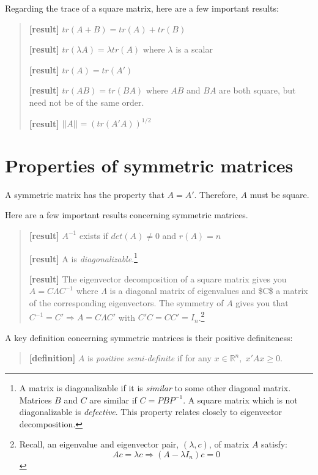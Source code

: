 \documentclass[
  letterpaper,
  DIV=11,
  numbers=noendperiod]{scrreprt}
\begin{document}
Regarding the trace of a square matrix, here are a few important
results:

\begin{quote}
\textbf{{[}result{]}} \(tr(A+B) = tr(A) + tr(B)\)

\textbf{{[}result{]}} \(tr(\lambda A) = \lambda tr(A)\) where
\(\lambda\) is a scalar

\textbf{{[}result{]}} \(tr(A) = tr(A')\)

\textbf{{[}result{]}} \(tr(AB) = tr(BA)\) where \(AB\) and \(BA\) are
both square, but need not be of the same order.

\textbf{{[}result{]}} \(||A|| = (tr(A'A))^{1/2}\)
\end{quote}

\hypertarget{properties-of-symmetric-matrices}{%
\section{Properties of symmetric
matrices}\label{properties-of-symmetric-matrices}}

A symmetric matrix has the property that \(A=A'\). Therefore, \(A\) must
be square.

Here are a few important results concerning symmetric matrices.

\begin{quote}
\textbf{{[}result{]}} \(A^{-1}\) exists if \(det(A)\neq 0\) and
\(r(A)=n\)

\textbf{{[}result{]}} A is \emph{diagonalizable}.\footnote{A matrix is
  diagonalizable if it is \emph{similar} to some other diagonal matrix.
  Matrices \(B\) and \(C\) are similar if \(C=PBP^{-1}\). A square
  matrix which is not diagonalizable is \emph{defective}. This property
  relates closely to eigenvector decomposition.}

\textbf{{[}result{]}} The eigenvector decomposition of a square matrix
gives you \(A=C\Lambda C^{-1}\) where \(\Lambda\) is a diagonal matrix
of eigenvalues and \$C\$ a matrix of the corresponding eigenvectors. The
symmetry of \(A\) gives you that \(C^{-1}=C'\Rightarrow A=C\Lambda C'\)
with \(C'C=CC'=I_{n}\).\footnote{Recall, an eigenvalue and eigenvector
  pair, \((\lambda,c)\), of matrix \(A\) satisfy:\\
  \[
  Ac = \lambda c\Rightarrow (A-\lambda I_n)c=0
  \]}
\end{quote}

A key definition concerning symmetric matrices is their positive
definiteness:

\begin{quote}
\textbf{{[}definition{]}} \(A\) is \emph{positive semi-definite} if for
any \(x\in\mathbb{R}^n,\;x'Ax\geq0\).
\end{quote}
\end{document}
